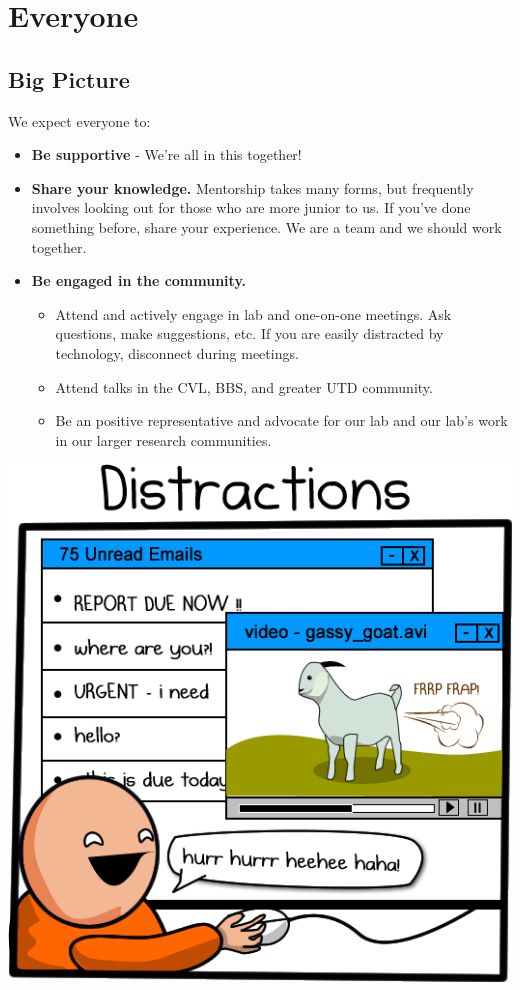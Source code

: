 \documentclass[
]{book}
\providecommand{\tightlist}{%
  \setlength{\itemsep}{0pt}\setlength{\parskip}{0pt}}
\begin{document}
\hypertarget{everyone}{%
\section{Everyone}\label{everyone}}

\hypertarget{big-picture}{%
\subsection{Big Picture}\label{big-picture}}

We expect everyone to:

\begin{itemize}
\tightlist
\item
  \textbf{Be supportive} - We're all in this together!\\
\item
  \textbf{Share your knowledge.} Mentorship takes many forms, but frequently involves looking out for those who are more junior to us. If you've done something before, share your experience. We are a team and we should work together.
\item
  \textbf{Be engaged in the community.}

  \begin{itemize}
  \tightlist
  \item
    Attend and actively engage in lab and one-on-one meetings. Ask questions, make suggestions, etc. If you are easily distracted by technology, disconnect during meetings.\\
  \item
    Attend talks in the CVL, BBS, and greater UTD community.\\
  \item
    Be an positive representative and advocate for our lab and our lab's work in our larger research communities.
  \end{itemize}
\end{itemize}

\includegraphics{images/distractions.png}
\end{document}
